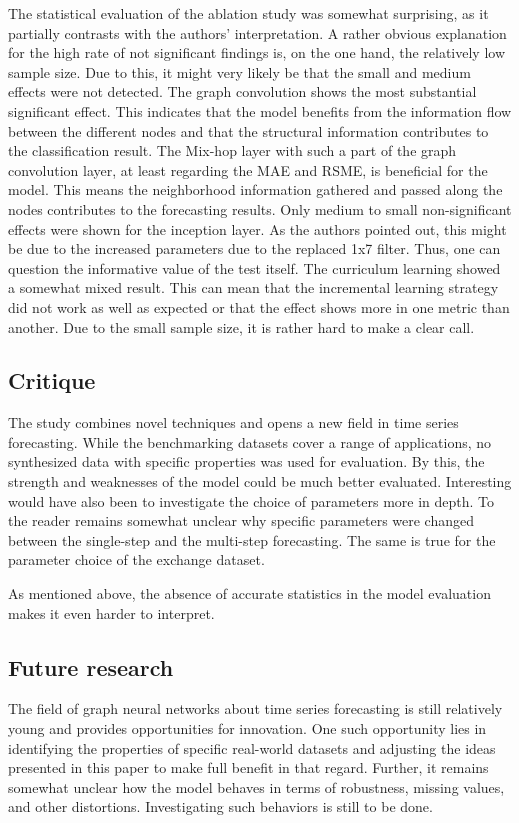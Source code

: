 \documentclass[letterpaper, twocolumn,11pt]{article}
\begin{document}
The statistical evaluation of the ablation study was somewhat surprising, as it partially contrasts with the authors' interpretation.
A rather obvious explanation for the high rate of not significant findings is, on the one hand, the relatively low sample size. Due to this, it might very likely be that the small and medium effects were not detected.
The graph convolution shows the most substantial significant effect. This indicates that the model benefits from the information flow between the different nodes and that the structural information contributes to the classification result.
The Mix-hop layer with such a part of the graph convolution layer, at least regarding the MAE and RSME, is beneficial for the model. This means the neighborhood information gathered and passed along the nodes contributes to the forecasting results.
Only medium to small non-significant effects were shown for the inception layer. As the authors pointed out, this might be due to the increased parameters due to the replaced 1x7 filter. Thus, one can question the informative value of the test itself.
The curriculum learning showed a somewhat mixed result. This can mean that the incremental learning strategy did not work as well as expected or that the effect shows more in one metric than another. Due to the small sample size, it is rather hard to make a clear call.

    \subsection{Critique}
    The study combines novel techniques and opens a new field in time series forecasting.
    While the benchmarking datasets cover a range of applications, no synthesized data with specific properties was used for evaluation.
    By this, the strength and weaknesses of the model could be much better evaluated.
    Interesting would have also been to investigate the choice of parameters more in depth.
    To the reader remains somewhat unclear why specific parameters were changed between the single-step and the multi-step forecasting.
    The same is true for the parameter choice of the exchange dataset.

    As mentioned above, the absence of accurate statistics in the model evaluation makes it even harder to interpret.


    \subsection{Future research}
    The field of graph neural networks about time series forecasting is still relatively young and provides opportunities for innovation.
    One such opportunity lies in identifying the properties of specific real-world datasets and adjusting the ideas presented in this paper to make full benefit in that regard.
    Further, it remains somewhat unclear how the model behaves in terms of robustness, missing values, and other distortions. Investigating such behaviors is still to be done.
\end{document}
